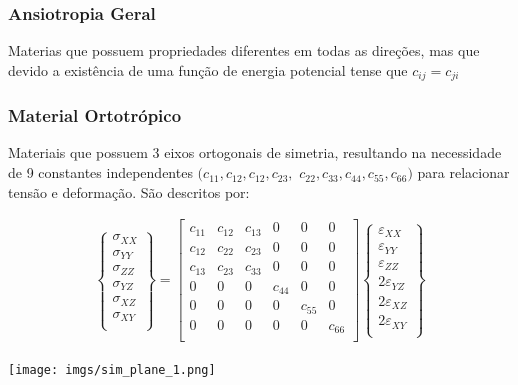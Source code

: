 \documentclass{article}
\begin{document}
\subsubsection*{Ansiotropia Geral}
Materias que possuem propriedades diferentes em todas as direções, mas que devido a existência de uma função de energia potencial tense que $c_{ij} = c_{ji}$

\subsubsection*{Material Ortotrópico}
Materiais que possuem 3 eixos ortogonais de simetria, resultando na necessidade de 9 constantes independentes $(c_{11}, c_{12}, c_{12}, c_{23}, $ $c_{22}, c_{33}, c_{44}, c_{55}, c_{66})$ para relacionar tensão e deformação. São descritos por:

\begin{minipage}{.5\textwidth}
    \begin{align*}
        \begin{Bmatrix}
            \sigma_{XX} \\
            \sigma_{YY} \\
            \sigma_{ZZ} \\
            \sigma_{YZ} \\
            \sigma_{XZ} \\
            \sigma_{XY} \\
        \end{Bmatrix} =
        \begin{bmatrix}
            c_{11} & c_{12} & c_{13} & 0      & 0      & 0      \\
            c_{12} & c_{22} & c_{23} & 0      & 0      & 0      \\
            c_{13} & c_{23} & c_{33} & 0      & 0      & 0      \\
            0      & 0      & 0      & c_{44} & 0      & 0      \\
            0      & 0      & 0      & 0      & c_{55} & 0      \\
            0      & 0      & 0      & 0      & 0      & c_{66} \\
        \end{bmatrix}
        \begin{Bmatrix}
            \varepsilon_{XX}  \\
            \varepsilon_{YY}  \\
            \varepsilon_{ZZ}  \\
            2\varepsilon_{YZ} \\
            2\varepsilon_{XZ} \\
            2\varepsilon_{XY} \\
        \end{Bmatrix}
    \end{align*}
\end{minipage}
\begin{minipage}{.5\textwidth}
    \centering
    \texttt{[image: imgs/sim\_plane\_1.png]}
\end{minipage}
\end{document}
